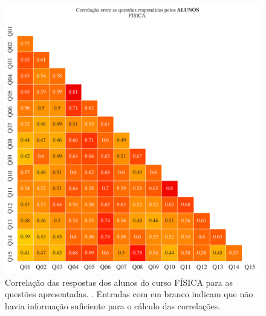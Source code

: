 \documentclass[a4paper,10pt]{article}
\begin{document}
\begin{figure}[h]
\centering
\includegraphics[width=0.999\linewidth]{matriz_corr__alunos_5000613.png}
\caption{\label{fig:corr_alunos}Correlação das respostas dos alunos do curso FÍSICA para as questões apresentadas. . Entradas com em branco indicam que não havia informação suficiente para o cálculo das correlações.}
\end{figure}
\end{document}
